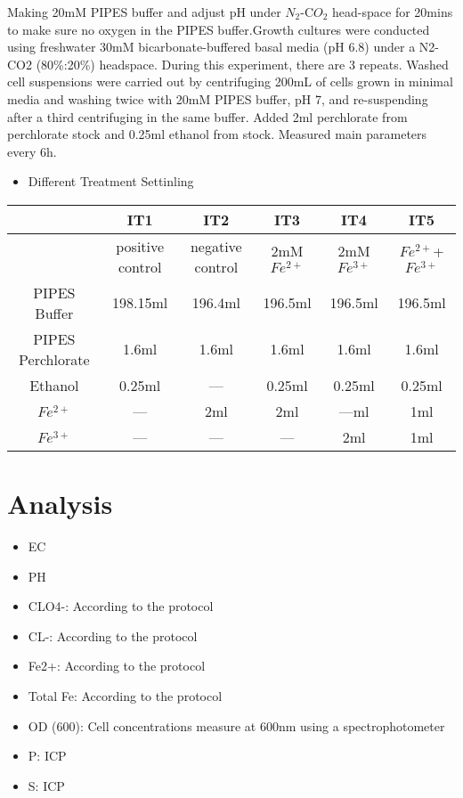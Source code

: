 \documentclass{article}
\begin{document}
Making 20mM PIPES buffer and adjust pH under $N_{2}$-C$O_{2}$ head-space for 20mins to make sure no oxygen in the PIPES buffer.Growth cultures were conducted using freshwater 30mM bicarbonate-buffered basal media (pH 6.8) under a N2-CO2 (80\%:20\%) headspace. During this experiment, there are 3 repeats. Washed cell suspensions were carried out by centrifuging 200mL of cells grown in minimal media and washing twice with 20mM PIPES buffer, pH 7, and re-suspending after a third centrifuging in the same buffer.	Added 2ml perchlorate from perchlorate stock and 0.25ml ethanol from stock. Measured main parameters every 6h.
\begin{itemize}
\item Different Treatment Settinling  
\end{itemize}


\begin{tabular}{c|c|c|c|c|c}
\centering
     & IT1& IT2& IT3& IT4& IT5 \\
     \hline 
      & positive control & negative control &2mM $Fe^{2+}$& 2mM $Fe^{3+}$& $Fe^{2+}$+$Fe^{3+}$\\
     PIPES Buffer& 198.15ml& 196.4ml& 196.5ml& 196.5ml& 196.5ml\\PIPES Perchlorate & 1.6ml& 1.6ml&1.6ml& 1.6ml& 1.6ml\\
     Ethanol & 0.25ml& --- & 0.25ml& 0.25ml& 0.25ml\\
     $Fe^{2+}$ & ---& 2ml&2ml& ---ml& 1ml\\
     $Fe^{3+}$ &---& ---&---& 2ml& 1ml\\
\end{tabular}

\section{Analysis}
\begin{itemize}
\item EC
\item PH
\item CLO4-: According to the protocol
\item CL-: According to the protocol
\item Fe2+: According to the protocol 
\item Total Fe: According to the protocol
\item OD (600):  Cell concentrations measure at 600nm using a spectrophotometer
\item P: ICP
\item S: ICP
\end{itemize}
\end{document}
